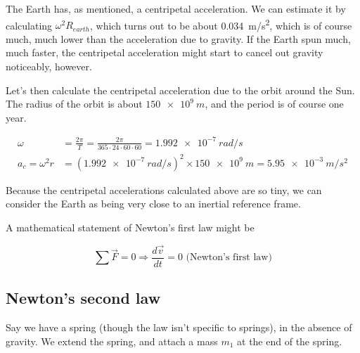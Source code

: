 The Earth has, as mentioned, a centripetal acceleration. We can estimate it by calculating $\omega^2 R_{earth}$, which turns out to be about \SI{0.034}{m/s^2}, which is of course much, much lower than the acceleration due to gravity. If the Earth spun much, much faster, the centripetal acceleration might start to cancel out gravity noticeably, however.

Let's then calculate the centripetal acceleration due to the orbit around the Sun. The radius of the orbit is about $\SI{150e9}{m}$, and the period is of course one year.

\begin{align}
\omega &= \frac{2 \pi}{T} = \frac{2 \pi}{365 \cdot 24 \cdot 60 \cdot 60} = \SI{1.992e-7}{rad/s}\\
a_c = \omega^2 r &= (\SI{1.992e-7}{rad/s})^2 \times \SI{150e9}{m} = \SI{5.95e-3}{m/s^2}
\end{align}

Because the centripetal accelerations calculated above are so tiny, we can consider the Earth as being very close to an inertial reference frame.

A mathematical statement of Newton's first law might be

\begin{equation}
\sum \vec{F} = 0 \Rightarrow \frac{d\vec{v}}{dt} = 0 \text{ (Newton's first law)} \label{eq:newton1}
\end{equation}

\subsection{Newton's second law}

Say we have a spring (though the law isn't specific to springs), in the absence of gravity. We extend the spring, and attach a mass $m_1$ at the end of the spring.

\begin{figure}[H]
     \centering
{}
\end{figure}

